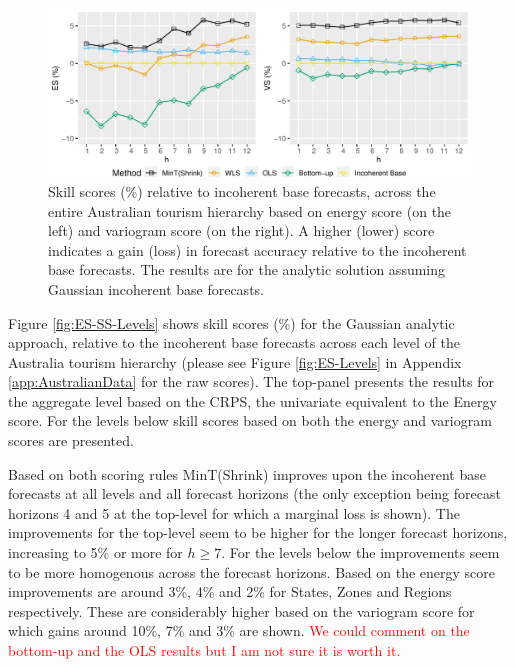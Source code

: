 \documentclass[12pt]{article}
\theoremstyle{definition}
\begin{document}
\begin{figure}
	\centering
	\small
    \includegraphics[width=.95\textwidth]{Empirical-results/Results-ARIMA/SkillScore_Overall.pdf}
	\caption{Skill scores (\%) relative to incoherent base forecasts, across the entire Australian tourism hierarchy based on energy score (on the left) and variogram score (on the right). A higher (lower) score indicates a gain (loss) in forecast accuracy relative to the incoherent base forecasts. The results are for the analytic solution assuming Gaussian incoherent base forecasts.} \label{fig:SkillScores_Overall}
\end{figure}

Figure \ref{fig:ES-SS-Levels} shows skill scores (\%) for the Gaussian analytic approach, relative to the incoherent base forecasts across each level of the Australia tourism hierarchy (please see Figure \ref{fig:ES-Levels} in Appendix \ref{app:AustralianData} for the raw scores). The top-panel presents the results for the aggregate level based on the CRPS, the univariate equivalent to the Energy score. For the levels below skill scores based on both the energy and variogram scores are presented.

Based on both scoring rules MinT(Shrink) improves upon the incoherent base forecasts at all levels and all forecast horizons (the only exception being forecast horizons 4 and 5 at the top-level for which a marginal loss is shown). The improvements for the top-level seem to be higher for the longer forecast horizons, increasing to 5\% or more for $h\ge7$. For the levels below the improvements seem to be more homogenous across the forecast horizons. Based on the energy score improvements are around 3\%, 4\% and 2\% for States, Zones and Regions respectively. These are considerably higher based on the variogram score for which gains around 10\%, 7\% and 3\% are shown. \textcolor{red}{We could comment on the bottom-up and the OLS results but I am not sure it is worth it.}
\end{document}
